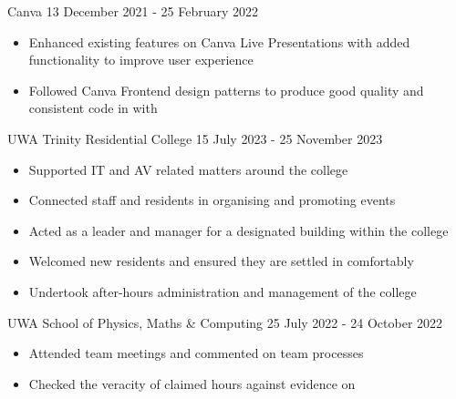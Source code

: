 \documentclass[paper=a4,fontsize=9pt]{resume}
\begin{document}
{		
			{Canva}
			{13 December 2021 - 25 February 2022}
		\begin{itemize}
			\item Enhanced existing features on Canva Live Presentations with added functionality to improve user experience
			\item Followed Canva Frontend design patterns to produce good quality and consistent code in  with 
		\end{itemize}

		\divider

			{UWA Trinity Residential College}
			{15 July 2023 - 25 November 2023}
		\begin{itemize}
			\item Supported IT and AV related matters around the college
			\item Connected staff and residents in organising and promoting events
			\item Acted as a leader and manager for a designated building within the college
			\item Welcomed new residents and ensured they are settled in comfortably
			\item Undertook after-hours administration and management of the college
		\end{itemize}



		\divider

			{UWA School of Physics, Maths \& Computing}
			{25 July 2022 - 24 October 2022}
		\begin{itemize}
			\item Attended team meetings and commented on team processes
			\item Checked the veracity of claimed hours against evidence on 
		\end{itemize}

}
\end{document}
